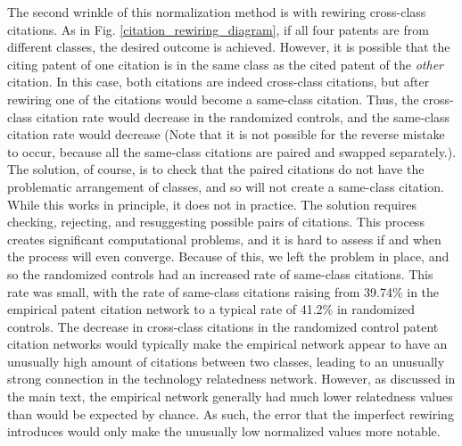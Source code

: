 \documentclass[pre,reprint,groupedaddress,superscriptaddress]{revtex4-1}
\begin{document}
The second wrinkle of this normalization method is with rewiring cross-class citations. As in Fig. \ref{citation_rewiring_diagram}, if all four patents are from different classes, the desired outcome is achieved. However, it is possible that the citing patent of one citation is in the same class as the cited patent of the \textit{other} citation. In this case, both citations are indeed cross-class citations, but after rewiring one of the citations would become a same-class citation. Thus, the cross-class citation rate would decrease in the randomized controls, and the same-class citation rate would decrease (Note that it is not possible for the reverse mistake to occur, because all the same-class citations are paired and swapped separately.). The solution, of course, is to check that the paired citations do not have the problematic arrangement of classes, and so will not create a same-class citation. While this works in principle, it does not in practice. The solution requires checking, rejecting, and resuggesting possible pairs of citations. This process creates significant computational problems, and it is hard to assess if and when the process will even converge. Because of this, we left the problem in place, and so the randomized controls had an increased rate of same-class citations. This rate was small, with the rate of same-class citations raising from 39.74\% in the empirical patent citation network to a typical rate of 41.2\% in randomized controls. The decrease in cross-class citations in the randomized control patent citation networks would typically make the empirical network appear to have an unusually high amount of citations between two classes, leading to an unusually strong connection in the technology relatedness network. However, as discussed in the main text, the empirical network generally had much lower relatedness values than would be expected by chance. As such, the error that the imperfect rewiring introduces would only make the unusually low normalized values more notable.
\end{document}
